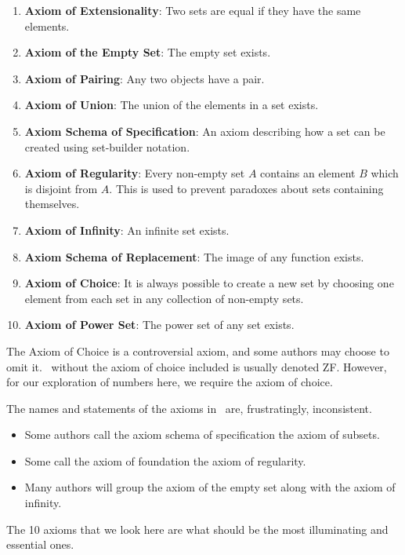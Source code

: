 \begin{enumerate}
    \item \textbf{Axiom of Extensionality}: Two sets are equal if they have the same elements.
    \item \textbf{Axiom of the Empty Set}: The empty set exists.
    \item \textbf{Axiom of Pairing}: Any two objects have a pair.
    \item \textbf{Axiom of Union}: The union of the elements in a set exists.
    \item \textbf{Axiom Schema of Specification}: An axiom describing how a set can be created using set-builder notation.
    \item \textbf{Axiom of Regularity}: Every non-empty set $A$ contains an element $B$ which is disjoint from $A$. This is used to prevent paradoxes about sets containing themselves.
    \item \textbf{Axiom of Infinity}: An infinite set exists.
    \item \textbf{Axiom Schema of Replacement}: The image of any function exists.
    \item \textbf{Axiom of Choice}: It is always possible to create a new set by choosing one element from each set in any collection of non-empty sets.
    \item \textbf{Axiom of Power Set}: The power set of any set exists.
\end{enumerate}
\begin{remark}
    The Axiom of Choice is a controversial axiom, and some authors may choose to omit it. \ZFC~without the axiom of choice included is usually denoted \textsf{ZF}. However, for our exploration of numbers here, we require the axiom of choice.    
\end{remark}
\begin{remark}
    The names and statements of the axioms in \ZFC~are, frustratingly, inconsistent.
    \begin{itemize}
        \item Some authors call the axiom schema of specification the axiom of subsets.
        \item Some call the axiom of foundation the axiom of regularity.
        \item Many authors will group the axiom of the empty set along with the axiom of infinity.
    \end{itemize}
    The 10 axioms that we look here are what should be the most illuminating and essential ones.
\end{remark}

